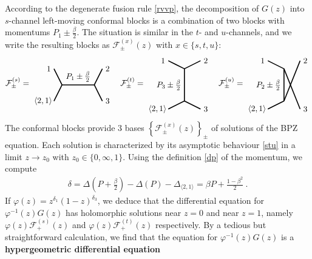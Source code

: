 \documentclass[12pt, a4paper]{article}
\theoremstyle{break}
\begin{document}
According to the degenerate fusion rule \eqref{rvvp}, the decomposition of $G(z)$ into $s$-channel left-moving conformal blocks is a combination of two blocks with momentums $P_1\pm \frac{\beta}{2}$. The situation is similar in the $t$- and $u$-channels, and we write the resulting blocks as $\mathcal{F}^{(x)}_\pm(z)$ with $x\in\{s,t,u\}$:
\begin{align}
\mathcal{F}^{(s)}_\pm = 
 \begin{tikzpicture}[baseline=(current  bounding  box.center), very thick, scale = .35]
\draw (-1,2) node [left] {$1$} -- (0,0) -- node [above] {$P_1\pm\frac{\beta}{2}$} (4,0) -- (5,2) node [right] {$2$};
\draw (-1,-2) node [left] {$\langle 2,1\rangle\!$} -- (0,0);
\draw (4,0) -- (5,-2) node [right] {$3$};
\end{tikzpicture}
\quad 
\mathcal{F}^{(t)}_\pm = 
\begin{tikzpicture}[baseline=(current  bounding  box.center), very thick, scale = .35]
 \draw (-2,3) node [left] {$1$} -- (0,2) -- node [left] {$P_3\pm\frac{\beta}{2}$} (0,-2) -- (-2, -3) node [left] {$\langle 2,1\rangle\!$};
\draw (0,2) -- (2,3) node [right] {$2$};
\draw (0,-2) -- (2, -3) node [right] {$3$};
\end{tikzpicture}
\quad 
\mathcal{F}^{(u)}_\pm = 
\begin{tikzpicture}[baseline=(current  bounding  box.center), very thick, scale = .35]
\draw (-2,1) node [left] {$1$} -- (0,0) -- node [left] {$P_2\pm \frac{\beta}{2}$} (0,-4) ;
\draw (0,0)-- (2,-5) node [right] {$3$};
\draw (-2,-5) node [left] {$\langle 2,1\rangle\!$} -- (0,-4);
\draw (0,-4) -- (2,1) node [right] {$2$};
\end{tikzpicture} 
\end{align}
The conformal blocks provide 3 bases $\left\{\mathcal{F}^{(x)}_\pm(z)\right\}_\pm$ of solutions of the BPZ equation. Each solution is characterized by its asymptotic behaviour \eqref{stu} in a limit $z\to z_0$ with $z_0\in\{0,\infty,1\}$. Using the definition \eqref{dp} of the momentum, we compute 
\begin{align}
 \delta=\Delta\left(P+\tfrac{\beta}{2}\right) - \Delta(P) -\Delta_{\langle 2,1\rangle} = \beta P + \tfrac{1-\beta^2}{2}\ .
\end{align}
If $\varphi(z) = z^{\delta_1}(1-z)^{\delta_3}$, we deduce that the differential equation for $\varphi^{-1}(z) G(z)$ has holomorphic solutions near $z=0$ and near $z=1$, namely $\varphi(z)\mathcal{F}^{(s)}_+(z)$ and $\varphi(z)\mathcal{F}^{(t)}_+(z)$ respectively. By a tedious but straightforward calculation, we find that the equation for $\varphi^{-1}(z) G(z)$ is a \textbf{hypergeometric differential equation} 
\end{document}
